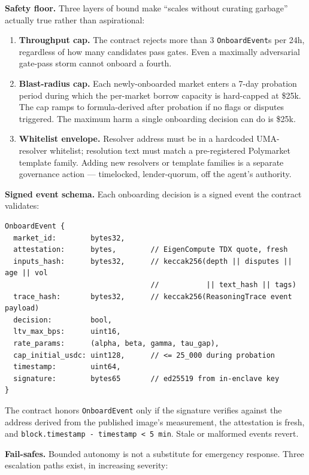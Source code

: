 \documentclass[11pt,letterpaper]{article}
\begin{document}
\textbf{Safety floor.} Three layers of bound make ``scales without curating garbage'' actually true rather than aspirational:

\begin{enumerate}[leftmargin=*,itemsep=2pt,topsep=2pt]
  \item \textbf{Throughput cap.} The contract rejects more than 3 \texttt{OnboardEvent}s per 24h, regardless of how many candidates pass gates. Even a maximally adversarial gate-pass storm cannot onboard a fourth.
  \item \textbf{Blast-radius cap.} Each newly-onboarded market enters a 7-day probation period during which the per-market borrow capacity is hard-capped at \$25k. The cap ramps to formula-derived after probation if no flags or disputes triggered. The maximum harm a single onboarding decision can do is \$25k.
  \item \textbf{Whitelist envelope.} Resolver address must be in a hardcoded UMA-resolver whitelist; resolution text must match a pre-registered Polymarket template family. Adding new resolvers or template families is a separate governance action --- timelocked, lender-quorum, off the agent's authority.
\end{enumerate}

\textbf{Signed event schema.} Each onboarding decision is a signed event the contract validates:

\begin{lstlisting}
OnboardEvent {
  market_id:        bytes32,
  attestation:      bytes,        // EigenCompute TDX quote, fresh
  inputs_hash:      bytes32,      // keccak256(depth || disputes || age || vol
                                  //           || text_hash || tags)
  trace_hash:       bytes32,      // keccak256(ReasoningTrace event payload)
  decision:         bool,
  ltv_max_bps:      uint16,
  rate_params:      (alpha, beta, gamma, tau_gap),
  cap_initial_usdc: uint128,      // <= 25_000 during probation
  timestamp:        uint64,
  signature:        bytes65       // ed25519 from in-enclave key
}
\end{lstlisting}

The contract honors \texttt{OnboardEvent} only if the signature verifies against the address derived from the published image's measurement, the attestation is fresh, and \texttt{block.timestamp - timestamp < 5 min}. Stale or malformed events revert.

\textbf{Fail-safes.} Bounded autonomy is not a substitute for emergency response. Three escalation paths exist, in increasing severity:
\end{document}
